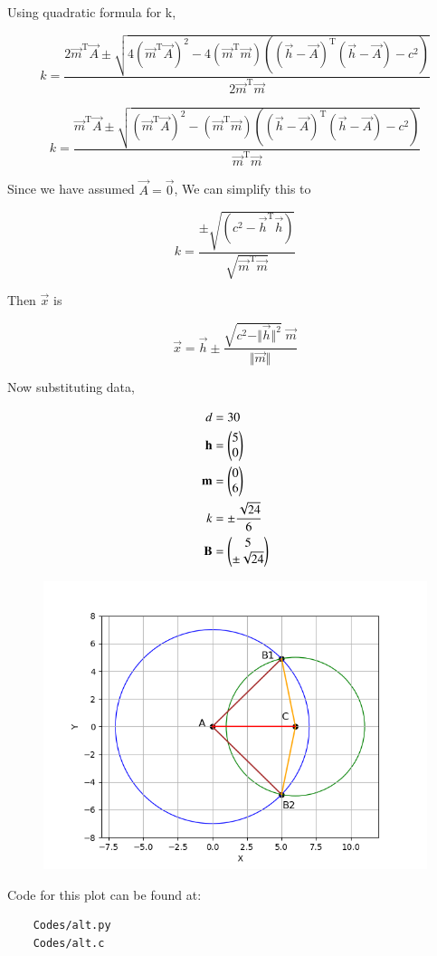 \documentclass[journal]{IEEEtran}
\begin{document}
Using quadratic formula for k,

$$k = \frac{2\vec{m}^\text{T}\vec{A} \pm \sqrt{4(\vec{m}^\text{T}\vec{A})^2 - 4 (\vec{m}^\text{T}\vec{m})((\vec{h} - \vec{A})^\text{T}(\vec{h} - \vec{A}) - c^2)}}{2\vec{m}^\text{T}\vec{m}}$$

$$k = \frac{\vec{m}^\text{T}\vec{A} \pm \sqrt{(\vec{m}^\text{T}\vec{A})^2 - (\vec{m}^\text{T}\vec{m})((\vec{h} - \vec{A})^\text{T}(\vec{h} - \vec{A}) - c^2)}}{\vec{m}^\text{T}\vec{m}}$$

Since we have assumed $\vec{A} = \vec{0}$, We can simplify this to

$$k = \frac{\pm \sqrt{(c^2 - \vec{h}^\text{T}\vec{h})}}{\sqrt{\vec{m}^\text{T}\vec{m}}}$$

Then $\vec{x}$ is

$$\vec{x} = \vec{h} \pm \frac{\sqrt{c^2 - \Vert \vec{h} \Vert^2} \; \vec{m}}{\Vert \vec{m} \Vert}$$

Now substituting data,

\begin{align*}
	d &= 30\\
	\mathbf{h} &= \begin{pmatrix}5 \\ 0\end{pmatrix}\\
	\mathbf{m} &= \begin{pmatrix}0 \\ 6\end{pmatrix}\\
	k &= \pm \frac{\sqrt{24}}{6}\\
	\mathbf{B} &= \begin{pmatrix}5 \\ \pm \sqrt{24}\end{pmatrix}
\end{align*}

\begin{figure}[H]
	\centering
	\includegraphics[width=0.75\columnwidth]{Figures/Alt_Figure.png}
	\label{fig}
\end{figure}

Code for this plot can be found at:
\begin{lstlisting}
    Codes/alt.py
    Codes/alt.c
\end{lstlisting}
\end{document}
